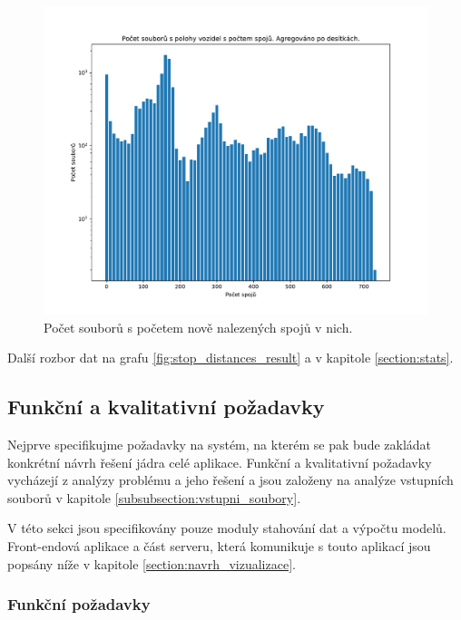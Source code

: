 \begin{figure}
	\centering
  \includegraphics[width=0.7\linewidth]{../img/vehicle_pos_x_all_trips}
  \caption{Počet souborů s početem nově nalezených spojů v nich.}
  \label{fig:vehicle_pos_x_all_trips}
\end{figure}

\bigbreak

Další rozbor dat na grafu \ref{fig:stop_distances_result} a v kapitole \ref{section:stats}.

\subsection{Funkční a kvalitativní požadavky}


Nejprve specifikujme požadavky na systém, na kterém se pak bude zakládat
konkrétní návrh řešení jádra celé aplikace. Funkční a kvalitativní požadavky vycházejí z analýzy problému a jeho řešení a jsou založeny na analýze vstupních souborů v kapitole \ref{subsubsection:vstupni_soubory}.

\bigbreak

V této sekci jsou specifikovány pouze moduly stahování dat a výpočtu modelů. Front-endová aplikace a část serveru, která komunikuje s touto aplikací jsou popsány níže v kapitole \ref{section:navrh_vizualizace}.


\subsubsection{Funkční požadavky}


